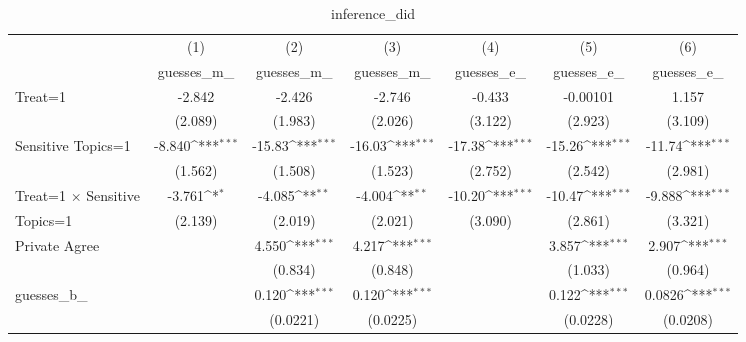 \begin{table}[htbp]\centering
\def\sym#1{\ifmmode^{#1}\else\(^{#1}\)\fi}
\caption{inference\_did}
\begin{tabular}{l*{6}{c}}
\hline\hline
                                &\multicolumn{1}{c}{(1)}&\multicolumn{1}{c}{(2)}&\multicolumn{1}{c}{(3)}&\multicolumn{1}{c}{(4)}&\multicolumn{1}{c}{(5)}&\multicolumn{1}{c}{(6)}\\
                                &\multicolumn{1}{c}{guesses\_m\_}&\multicolumn{1}{c}{guesses\_m\_}&\multicolumn{1}{c}{guesses\_m\_}&\multicolumn{1}{c}{guesses\_e\_}&\multicolumn{1}{c}{guesses\_e\_}&\multicolumn{1}{c}{guesses\_e\_}\\
\hline
Treat=1                         &   -2.842         &   -2.426         &   -2.746         &   -0.433         & -0.00101         &    1.157         \\
                                &  (2.089)         &  (1.983)         &  (2.026)         &  (3.122)         &  (2.923)         &  (3.109)         \\
Sensitive Topics=1              &   -8.840\sym{***}&   -15.83\sym{***}&   -16.03\sym{***}&   -17.38\sym{***}&   -15.26\sym{***}&   -11.74\sym{***}\\
                                &  (1.562)         &  (1.508)         &  (1.523)         &  (2.752)         &  (2.542)         &  (2.981)         \\
Treat=1 $\times$ Sensitive      &   -3.761\sym{*}  &   -4.085\sym{**} &   -4.004\sym{**} &   -10.20\sym{***}&   -10.47\sym{***}&   -9.888\sym{***}\\
Topics=1                        &  (2.139)         &  (2.019)         &  (2.021)         &  (3.090)         &  (2.861)         &  (3.321)         \\
Private Agree                   &                  &    4.550\sym{***}&    4.217\sym{***}&                  &    3.857\sym{***}&    2.907\sym{***}\\
                                &                  &  (0.834)         &  (0.848)         &                  &  (1.033)         &  (0.964)         \\
guesses\_b\_                      &                  &    0.120\sym{***}&    0.120\sym{***}&                  &    0.122\sym{***}&   0.0826\sym{***}\\
                                &                  & (0.0221)         & (0.0225)         &                  & (0.0228)         & (0.0208)         \\

\end{tabular}
\end{table}
